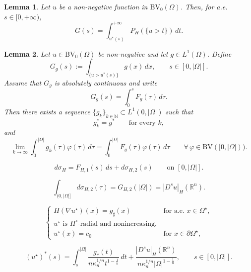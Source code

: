 \documentclass[10pt,a4paper]{amsart}
\newtheorem{lemma}{Lemma}
\newcommand{\BV}{\text{BV}}
\begin{document}
\begin{lemma}\label{lem:G_derivative}
Let $u$ be a non-negative function in $\BV_0(\Omega)$. Then, for a.e. $s\in[0,+\infty)$,
\begin{equation}\label{eq:G_integral}
    G(s)=\int_{u^*(s)}^{+\infty} P_H(\{u>t\})\,dt.
\end{equation}
\end{lemma}

\begin{lemma}\label{lem:approximation}
Let \(u\in \BV_0(\Omega)\) be non-negative and let \(g\in L^1(\Omega)\). Define
\[
G_g(s):=\int_{\{u>u^*(s)\}} g(x)\,dx,
\qquad s\in[0,|\Omega|].
\]
Assume that \(G_g\) is absolutely continuous and write
\[
G_g(s)=\int_0^s F_g(\tau)\,d\tau .
\]
Then there exists a sequence \(\{g_k\}_{k\in\mathbb N}\subset L^1(0,|\Omega|)\) such that
\[
g_k^*=g^*
\qquad\text{for every }k,
\]
and
\[
\lim_{k\to\infty}
\int_0^{|\Omega|}g_k(\tau)\varphi(\tau)\,d\tau
=
\int_0^{|\Omega|}F_g(\tau)\varphi(\tau)\,d\tau
\qquad
\forall\,\varphi\in \BV([0,|\Omega|)).
\]
\end{lemma}

\begin{equation}\label{eq:sigma_decomposition}
d\sigma_H = F_{H,1}(s)\,ds + d\sigma_{H,2}(s)
\qquad \text{on }[0,|\Omega|].
\end{equation}

\begin{equation}\label{eq:sigma2_total_mass}
\int_{(0,|\Omega|]} d\sigma_{H,2}(\tau)
=
G_{H,2}(|\Omega|)
=
|D^s u|_H(\mathbb{R}^n).
\end{equation}

\begin{equation}\label{eq:ustar_problem}
\begin{cases}
H(\nabla u^\star)(x)=g_\sharp(x) & \text{for a.e. }x\in\Omega^\star,\\[1ex]
u^\star \text{ is } H^\circ\text{-radial and nonincreasing},\\[1ex]
u^\star(x)=c_0 & \text{for }x\in\partial\Omega^\star,
\end{cases}
\end{equation}

\begin{equation}\label{eq:ustar_rearrangement_explicit}
(u^\star)^*(s)
=
\int_s^{|\Omega|}
\frac{g_*(t)}{n\kappa_n^{1/n} t^{1-\frac1n}}\,dt
+
\frac{|D^s u|_H(\mathbb{R}^n)}{n\kappa_n^{1/n}|\Omega|^{1-\frac1n}},
\qquad s\in[0,|\Omega|].
\end{equation}
\end{document}
